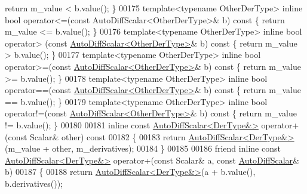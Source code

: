 \begin{DoxyCode}
{      return} m\_value <  b.value(); \}
00175     \textcolor{keyword}{template}<\textcolor{keyword}{typename} OtherDerType> \textcolor{keyword}{inline} \textcolor{keywordtype}{bool} operator<=(const AutoDiffScalar<OtherDerType>& b) \textcolor{keyword}{const}  \{ \textcolor{keywordflow}{
      return} m\_value <= b.value(); \}
00176     \textcolor{keyword}{template}<\textcolor{keyword}{typename} OtherDerType> \textcolor{keyword}{inline} \textcolor{keywordtype}{bool} operator> (\textcolor{keyword}{const} 
      \hyperlink{class_eigen_1_1_auto_diff_scalar}{AutoDiffScalar<OtherDerType>}& b)\textcolor{keyword}{ const  }\{ \textcolor{keywordflow}{return} m\_value >  b.value(); \}
00177     \textcolor{keyword}{template}<\textcolor{keyword}{typename} OtherDerType> \textcolor{keyword}{inline} \textcolor{keywordtype}{bool} operator>=(\textcolor{keyword}{const} 
      \hyperlink{class_eigen_1_1_auto_diff_scalar}{AutoDiffScalar<OtherDerType>}& b)\textcolor{keyword}{ const  }\{ \textcolor{keywordflow}{return} m\_value >= b.value(); \}
00178     \textcolor{keyword}{template}<\textcolor{keyword}{typename} OtherDerType> \textcolor{keyword}{inline} \textcolor{keywordtype}{bool} operator==(\textcolor{keyword}{const} 
      \hyperlink{class_eigen_1_1_auto_diff_scalar}{AutoDiffScalar<OtherDerType>}& b)\textcolor{keyword}{ const  }\{ \textcolor{keywordflow}{return} m\_value == b.value(); \}
00179     \textcolor{keyword}{template}<\textcolor{keyword}{typename} OtherDerType> \textcolor{keyword}{inline} \textcolor{keywordtype}{bool} operator!=(\textcolor{keyword}{const} 
      \hyperlink{class_eigen_1_1_auto_diff_scalar}{AutoDiffScalar<OtherDerType>}& b)\textcolor{keyword}{ const  }\{ \textcolor{keywordflow}{return} m\_value != b.value(); \}
00180 
00181     \textcolor{keyword}{inline} \textcolor{keyword}{const} \hyperlink{class_eigen_1_1_auto_diff_scalar}{AutoDiffScalar<DerType&>} operator+(\textcolor{keyword}{const} Scalar& other)\textcolor{keyword}{ const}
00182 \textcolor{keyword}{    }\{
00183       \textcolor{keywordflow}{return} \hyperlink{class_eigen_1_1_auto_diff_scalar}{AutoDiffScalar<DerType&>}(m\_value + other, m\_derivatives);
00184     \}
00185 
00186     \textcolor{keyword}{friend} \textcolor{keyword}{inline} \textcolor{keyword}{const} \hyperlink{class_eigen_1_1_auto_diff_scalar}{AutoDiffScalar<DerType&>} operator+(\textcolor{keyword}{const} Scalar& a, \textcolor{keyword}{const} 
      \hyperlink{class_eigen_1_1_auto_diff_scalar}{AutoDiffScalar}& b)
00187     \{
00188       \textcolor{keywordflow}{return} \hyperlink{class_eigen_1_1_auto_diff_scalar}{AutoDiffScalar<DerType&>}(a + b.value(), b.derivatives());

\end{DoxyCode}
